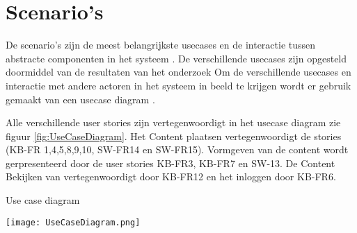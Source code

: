 \section{Scenario's}
De scenario's zijn de meest belangrijkste usecases en de interactie tussen abstracte componenten in het systeem \parencite{4+1ViewModelPaper}.
De verschillende usecases zijn opgesteld doormiddel van de resultaten van het onderzoek \parencite{DanteOnderzoek}
Om de verschillende usecases en interactie met andere actoren in het systeem in beeld te krijgen wordt er gebruik gemaakt van een usecase diagram \parencite{UseCaseDiagram}.

\whitespace
Alle verschillende user stories zijn vertegenwoordigt in het usecase diagram zie figuur \ref{fig:UseCaseDiagram}.
Het Content plaatsen vertegenwoordigt de stories (KB-FR 1,4,5,8,9,10, SW-FR14 en SW-FR15).
Vormgeven van de content wordt gerpresenteerd door de user stories KB-FR3, KB-FR7 en SW-13.
De Content Bekijken van vertegenwoordigt door KB-FR12 en het inloggen door KB-FR6.

\whitespace[2]
\begin{graphic}
	\captionsetup{type=figure}
	\caption{Use case diagram}
	\texttt{[image: UseCaseDiagram.png]}
	\label{fig:UseCaseDiagram}
\end{graphic}

